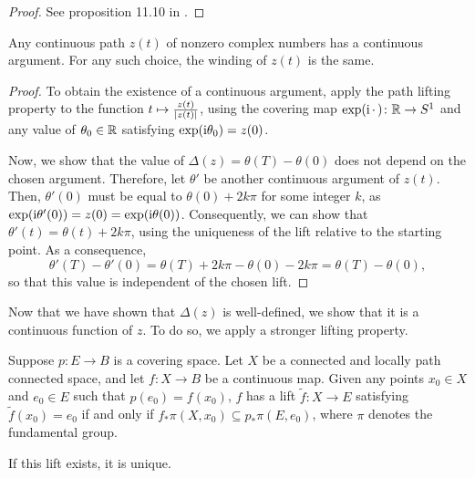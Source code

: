 \begin{proof}
See proposition 11.10 in \cite{leetopological}.
\end{proof}

\begin{corollary}
Any continuous path $z(t)$ of nonzero complex numbers has a continuous argument. For any such choice, the winding of $z(t)$ is the same.
\end{corollary}

\begin{proof}
To obtain the existence of a continuous argument, apply the path lifting property to the function $t \mapsto \frac{z(t)}{\lvert z(t)\rvert}$, using the covering map $\exp(\mathrm{i}\,\cdot\,) \colon \mathbb{R} \to S^1$ and any value of $\theta_0 \in \mathbb{R}$ satisfying $\exp(\mathrm{i} \theta_0) = z(0)$.

Now, we show that the value of $\Delta(z) = \theta(T) - \theta(0)$ does not depend on the chosen argument. Therefore, let $\theta'$ be another continuous argument of $z(t)$. Then, $\theta'(0)$ must be equal to $\theta(0) + 2 k \pi$ for some integer $k$, as $\exp(\mathrm{i}\theta'(0)) = z(0) = \exp(\mathrm{i} \theta(0))$. Consequently, we can show that $\theta'(t) = \theta(t) + 2 k \pi$, using the uniqueness of the lift relative to the starting point. As a consequence,
\begin{equation}
\theta'(T) - \theta'(0) = \theta(T) + 2 k \pi -  \theta(0) - 2 k \pi = \theta(T) - \theta(0),
\end{equation}
so that this value is independent of the chosen lift.
\end{proof}

Now that we have shown that $\Delta(z)$ is well-defined, we show that it is a continuous function of $z$. To do so, we apply a stronger lifting property.

\begin{prop}
Suppose $p \colon E \to B$ is a covering space. Let $X$ be a connected and locally path connected space, and let $f \colon X \to B$ be a continuous map. Given any points $x_0 \in X$ and $e_0 \in E$ such that $p(e_0) = f(x_0)$, $f$ has a lift $\tilde f \colon X \to E$ satisfying $\tilde f(x_0) = e_0$ if and only if $f_* \pi(X,x_0) \subseteq p_* \pi(E,e_0)$, where $\pi$ denotes the fundamental group.

If this lift exists, it is unique.
\end{prop}

